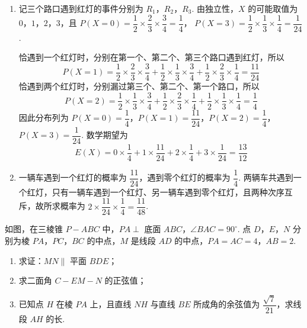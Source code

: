 \begin{solution}
\begin{enumerate}
\item 记三个路口遇到红灯的事件分别为 \(R_1\)，\(R_2\)，\(R_3\). 由独立性，\(X\) 的可能取值为 \(0\)，\(1\)，\(2\)，\(3\)，且
\(P(X=0)=\dfrac12\times\dfrac23\times\dfrac34=\dfrac14\)，
\(P(X=3)=\dfrac12\times\dfrac13\times\dfrac14=\dfrac1{24}\).

恰遇到一个红灯时，分别在第一个、第二个、第三个路口遇到红灯，所以
\[
P(X=1)=\frac12\times\frac23\times\frac34
+\frac12\times\frac13\times\frac34
+\frac12\times\frac23\times\frac14=\frac{11}{24}
\]
恰遇到两个红灯时，分别漏过第三个、第二个、第一个路口，所以
\[
P(X=2)=\frac12\times\frac13\times\frac34
+\frac12\times\frac23\times\frac14
+\frac12\times\frac13\times\frac14=\frac14
\]
因此分布列为
\(P(X=0)=\dfrac14\)，\(P(X=1)=\dfrac{11}{24}\)，\(P(X=2)=\dfrac14\)，\(P(X=3)=\dfrac1{24}\).
数学期望为
\[
E(X)=0\times\frac14+1\times\frac{11}{24}+2\times\frac14+3\times\frac1{24}=\frac{13}{12}
\]

\item 一辆车遇到一个红灯的概率为 \(\dfrac{11}{24}\)，遇到零个红灯的概率为 \(\dfrac14\). 两辆车共遇到一个红灯，只有一辆车遇到一个红灯、另一辆车遇到零个红灯，且两种次序互斥，故所求概率为
\(2\times\dfrac{11}{24}\times\dfrac14=\dfrac{11}{48}\).
\end{enumerate}
\end{solution}

\begin{problem}
如图，在三棱锥 \(P-ABC\) 中，\(PA\perp\) 底面 \(ABC\)，\(\angle BAC=90^\circ\). 点 \(D\)，\(E\)，\(N\) 分别为棱 \(PA\)，\(PC\)，\(BC\) 的中点，\(M\) 是线段 \(AD\) 的中点，\(PA=AC=4\)，\(AB=2\).

\begin{enumerate}
\item 求证：\(MN\parallel\) 平面 \(BDE\)；
\item 求二面角 \(C-EM-N\) 的正弦值；
\item 已知点 \(H\) 在棱 \(PA\) 上，且直线 \(NH\) 与直线 \(BE\) 所成角的余弦值为 \(\dfrac{\sqrt{7}}{21}\)，求线段 \(AH\) 的长.
\end{enumerate}

\end{problem}

